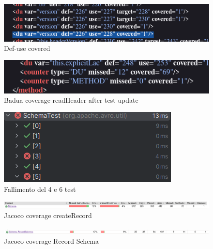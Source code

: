 \documentclass[12pt, a4paper]{article}
\begin{document}
  \begin{figure}
    \includegraphics[width=\linewidth]{./images/file_info/BaduaCoverageReadHeader3.png}
    \caption{Def-use covered}
    \label{fig:BaduaCoverageReadHeader3}
  \end{figure}

  \begin{figure}
    \includegraphics[width=\linewidth]{./images/file_info/BaduaCoverageReadHeader4.png}
    \caption{Badua coverage readHeader after test update}
    \label{fig:BaduaCoverageReadHeader4}
  \end{figure}



  \begin{figure}
    \includegraphics[width=\linewidth]{./images/create_record/TestFailsCreateRecord.png}
    \caption{Fallimento del 4 e 6 test}
    \label{fig:TestFailsCreateRecord}
  \end{figure}

  \begin{figure}
    \includegraphics[width=\linewidth]{./images/create_record/JacocoCoverage1.png}
    \caption{Jacoco coverage createRecord}
    \label{fig:JacocoCoverageCreateRecord1}
  \end{figure}

  \begin{figure}
    \includegraphics[width=\linewidth]{./images/create_record/JacocoCoverage2.png}
    \caption{Jacoco coverage Record Schema}
    \label{fig:JacocoCoverageCreateRecord2}
  \end{figure}
\end{document}
